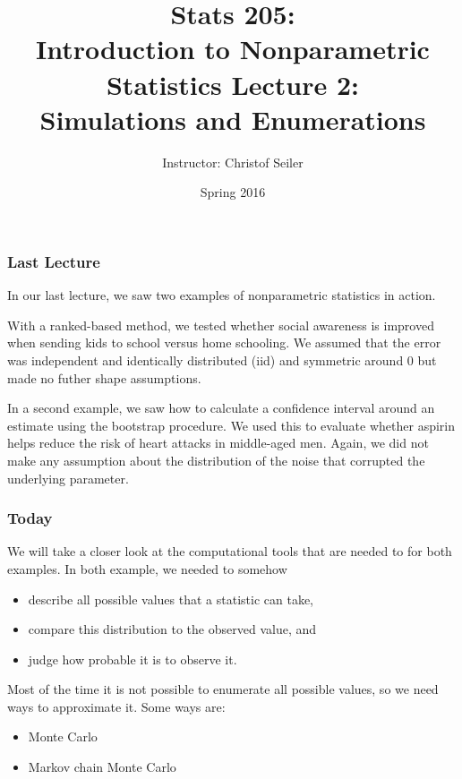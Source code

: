 \documentclass[10pt]{beamer}
\title{\large \bfseries Stats 205: \\ Introduction to Nonparametric Statistics \linebreak \linebreak \linebreak
Lecture 2: \\ Simulations and Enumerations}
\author{Instructor: Christof Seiler}
\date{Spring 2016}
\begin{document}
\frame{
\thispagestyle{empty}
\titlepage
}

\begin{frame}
\frametitle{Last Lecture}

In our last lecture, we saw two examples of nonparametric statistics in action. \newline

With a ranked-based method, we tested whether social awareness is improved when sending kids to school versus home schooling.
We assumed that the error was independent and identically distributed (iid) and symmetric around $0$ but made no futher shape assumptions. \newline

In a second example, we saw how to calculate a confidence interval around an estimate using the bootstrap procedure. We used this to evaluate whether aspirin helps reduce the risk of heart attacks in middle-aged men. 
Again, we did not make any assumption about the distribution of the noise that corrupted the underlying parameter. 

\end{frame}

\begin{frame}
\frametitle{Today}

We will take a closer look at the computational tools that are needed to for both examples. In both example, we needed to somehow 
\begin{itemize}
\item describe all possible values that a statistic can take, 
\item compare this distribution to the observed value, and 
\item judge how probable it is to observe it. 
\end{itemize}

\vspace{0.3cm}
Most of the time it is not possible to enumerate all possible values, so we need ways to approximate it. Some ways are:
\begin{itemize}
\item Monte Carlo
\item Markov chain Monte Carlo
\end{itemize}

\end{frame}
\end{document}
